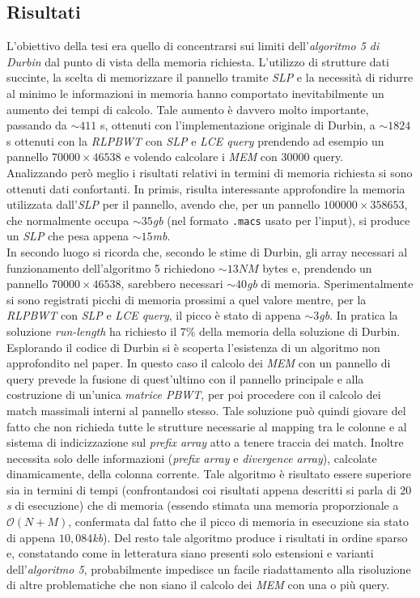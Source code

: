 \documentclass[a4paper,11pt, oneside,italian]{article}
\begin{document}
\subsection*{Risultati}
L'obiettivo della tesi era quello di concentrarsi sui limiti
dell'\textit{algoritmo 5 di Durbin} dal punto di vista della memoria
richiesta. L'utilizzo di strutture dati succinte, la scelta di memorizzare il
pannello tramite \textit{SLP} e la necessità di ridurre al minimo le
informazioni in memoria hanno comportato inevitabilmente un aumento dei tempi di
calcolo. Tale aumento è davvero molto importante, passando
da $\sim 411$ s, ottenuti con l'implementazione originale di Durbin, a $\sim
1824$ s 
ottenuti con la \textit{RLPBWT} con \textit{SLP} e \textit{LCE query} prendendo
ad esempio 
un pannello $70000 \times 46538$ e volendo calcolare i \textit{MEM} con $30000$
query. \\
Analizzando però meglio i risultati relativi in termini di memoria richiesta si
sono ottenuti dati confortanti. In primis, risulta interessante approfondire la
memoria utilizzata dall'\textit{SLP} per il pannello, avendo che, per un
pannello 
$100000\times 358653$, che normalmente occupa $\sim 
35$\textit{gb} (nel formato \texttt{.macs} usato per l'input), si produce un
\textit{SLP} che pesa appena $\sim 15$\textit{mb}.\\
In secondo luogo si ricorda che, secondo le stime di Durbin, gli array necessari
al funzionamento dell'algoritmo 5 richiedono $\sim 13NM$ bytes e,
prendendo un pannello $70000 \times 46538$, sarebbero
necessari $\sim 40$\textit{gb} di memoria. Sperimentalmente si sono registrati
picchi di memoria prossimi a quel valore mentre, per la \textit{RLPBWT} con
\textit{SLP} e \textit{LCE query}, il picco è stato di appena $\sim
3$\textit{gb}. In pratica la soluzione \textit{run-length} ha richiesto il 7\%
della memoria della soluzione di Durbin.\\
Esplorando il codice di Durbin si è scoperta
l'esistenza di un algoritmo non approfondito nel paper. In questo caso il
calcolo dei \textit{MEM} con un pannello di query prevede la fusione di
quest'ultimo 
con il pannello principale e alla costruzione di un'unica \textit{matrice PBWT},
per poi procedere con il calcolo dei match massimali interni 
al pannello stesso. Tale soluzione può quindi giovare del fatto che non richieda
tutte le strutture necessarie al mapping tra le colonne e al sistema di
indicizzazione sul \textit{prefix array} atto a tenere traccia dei
match. Inoltre necessita solo delle informazioni (\textit{prefix array} e
\textit{divergence array}), calcolate dinamicamente, della colonna corrente.
Tale algoritmo è risultato essere superiore sia in termini di tempi
(confrontandosi coi risultati appena descritti si parla di $20$\textit{s} di
esecuzione) che di memoria (essendo stimata una memoria proporzionale a
$\mathcal{O}(N+M)$, confermata dal fatto che il picco di memoria in esecuzione
sia stato di appena $10,084$\textit{kb}). Del resto tale algoritmo produce i
risultati in ordine sparso e, constatando come in letteratura siano presenti
solo estensioni e varianti dell'\textit{algoritmo 5}, probabilmente impedisce un
facile riadattamento alla risoluzione di altre problematiche che non siano il
calcolo dei \textit{MEM} con una o più query.
\end{document}

